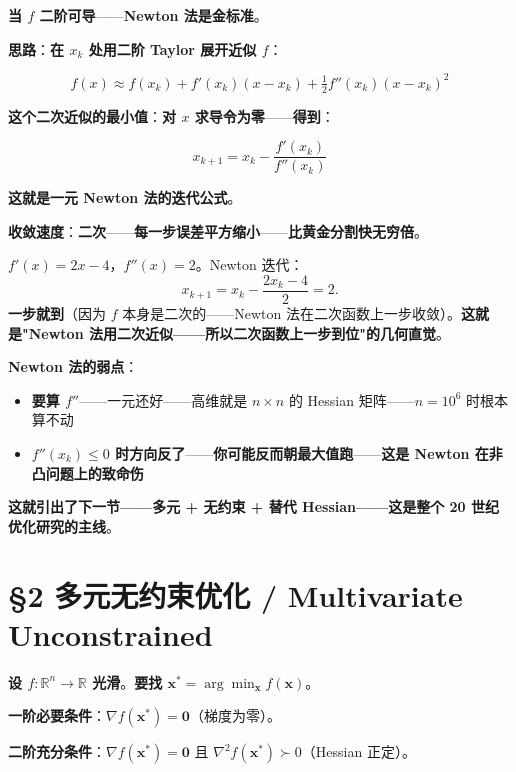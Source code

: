 \textbf{当 $f$ 二阶可导}——\textbf{Newton 法是金标准}。

\textbf{思路}：\textbf{在 $x_k$ 处用二阶 Taylor 展开近似 $f$}：

\begin{equation}
f(x) \approx f(x_k) + f'(x_k)(x - x_k) + \tfrac{1}{2} f''(x_k)(x - x_k)^2
\end{equation}

\textbf{这个二次近似的最小值}：\textbf{对 $x$ 求导令为零}——\textbf{得到}：

\begin{equation}
\boxed{\, x_{k+1} = x_k - \frac{f'(x_k)}{f''(x_k)} \,}
\end{equation}

\textbf{这就是一元 Newton 法的迭代公式}。

\textbf{收敛速度}：\textbf{二次}——\textbf{每一步误差平方缩小}——\textbf{比黄金分割快无穷倍}。

\begin{example}[Newton 找 $f(x) = x^2 - 4x + 3$ 的最小值]
$f'(x) = 2x - 4$，$f''(x) = 2$。Newton 迭代：
\[
x_{k+1} = x_k - \frac{2x_k - 4}{2} = 2.
\]
\textbf{一步就到}（因为 $f$ 本身是二次的——Newton 法在二次函数上一步收敛）。\textbf{这就是"Newton 法用二次近似——所以二次函数上一步到位"的几何直觉}。
\end{example}

\textbf{Newton 法的弱点}：

\begin{itemize}
\item \textbf{要算 $f''$}——一元还好——高维就是 $n \times n$ 的 Hessian 矩阵——$n=10^6$ 时根本算不动
\item \textbf{$f''(x_k) \le 0$ 时方向反了}——\textbf{你可能反而朝最大值跑}——\textbf{这是 Newton 在非凸问题上的致命伤}
\end{itemize}

\textbf{这就引出了下一节——\textbf{多元 + 无约束 + 替代 Hessian}——这是整个 20 世纪优化研究的主线}。

\section{§2 多元无约束优化 / Multivariate Unconstrained}

\textbf{设 $f: \mathbb{R}^n \to \mathbb{R}$ 光滑}。\textbf{要找 $\bm{x}^* = \arg\min_{\bm x} f(\bm x)$}。

\textbf{一阶必要条件}：$\nabla f(\bm x^*) = \bm 0$（梯度为零）。

\textbf{二阶充分条件}：$\nabla f(\bm x^*) = \bm 0$ 且 $\nabla^2 f(\bm x^*) \succ 0$（Hessian 正定）。

